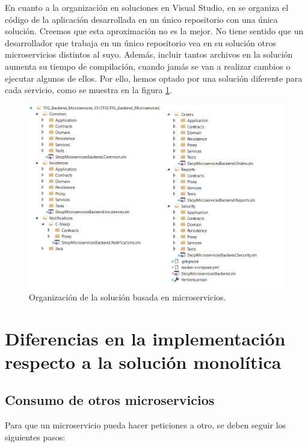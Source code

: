 \documentclass[11pt,spanish,listoffigures]{tfgetsinf}
\begin{document}
En cuanto a la organización en soluciones en Visual Studio, en \cite{DelaTorre2018} se organiza el código de la aplicación desarrollada en un único repositorio con una única solución. Creemos que esta aproximación no es la mejor. No tiene sentido que un desarrollador que trabaja en un único repositorio vea en su solución otros microservicios distintos al suyo. Además, incluir tantos archivos en la solución aumenta su tiempo de compilación, cuando jamás se van a realizar cambios o ejecutar algunos de ellos. Por ello, hemos optado por una solución diferente para cada servicio, como se muestra en la figura \ref{fig:MicroservicesSolution}.

\begin{figure}[h]
\centering
\includegraphics[scale=0.85]{MicroservicesSolution}
\caption{Organización de la solución basada en microservicios.}
\label{fig:MicroservicesSolution}
\end{figure}

\newpage

\section{Diferencias en la implementación respecto a la solución monolítica}

\subsection{Consumo de otros microservicios} \label{subsect:Consumo}

Para que un microservicio pueda hacer peticiones a otro, se deben seguir los siguientes pasos:
\end{document}
